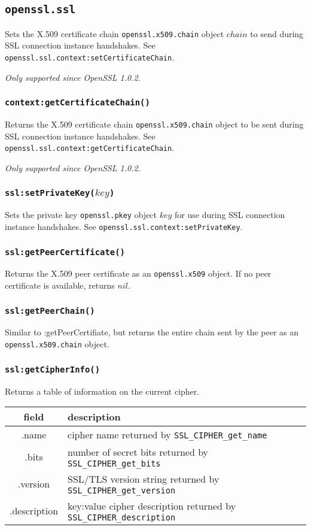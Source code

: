 \documentclass[11pt, oneside]{memoir}
\newcommand*{\fn}[1]{\texttt{#1}\xspace}
\newcommand*{\module}[1]{\texttt{#1}\xspace}
\newcounter{toccols}
\newenvironment{Module}[1]{
	\subsection{\texttt{#1}}
	\addtocontents{toc}{
		\protect\begin{multicols}{\value{toccols}}
	}
}{
	\addtocontents{toc}{\protect\end{multicols}}
}
\begin{document}
\begin{Module}{openssl.ssl}
Sets the X.509 certificate chain \module{openssl.x509.chain} object $chain$ to send during SSL connection instance handshakes.
See \fn{openssl.ssl.context:setCertificateChain}.

\emph{Only supported since OpenSSL 1.0.2.}

\subsubsection[\fn{context:getCertificateChain}]{\fn{context:getCertificateChain()}}

Returns the X.509 certificate chain \module{openssl.x509.chain} object to be sent during SSL connection instance handshakes.
See \fn{openssl.ssl.context:getCertificateChain}.

\emph{Only supported since OpenSSL 1.0.2.}

\subsubsection[\fn{ssl:setPrivateKey}]{\fn{ssl:setPrivateKey($key$)}}

Sets the private key \module{openssl.pkey} object $key$ for use during SSL connection instance handshakes.
See \fn{openssl.ssl.context:setPrivateKey}.

\subsubsection[\fn{ssl:getPeerCertificate}]{\fn{ssl:getPeerCertificate()}}

Returns the X.509 peer certificate as an \module{openssl.x509} object. If no peer certificate is available, returns $nil$.

\subsubsection[\fn{ssl:getPeerChain}]{\fn{ssl:getPeerChain()}}

Similar to :getPeerCertifiate, but returns the entire chain sent by the peer as an \module{openssl.x509.chain} object.

\subsubsection[\fn{ssl:getCipherInfo}]{\fn{ssl:getCipherInfo()}}

Returns a table of information on the current cipher.

\begin{tabular}{ c | l }
field & description\\\hline
.name & cipher name returned by \fn{SSL\_CIPHER\_get\_name}\\
.bits & number of secret bits returned by \fn{SSL\_CIPHER\_get\_bits}\\
.version & SSL/TLS version string returned by \fn{SSL\_CIPHER\_get\_version}\\
.description & key:value cipher description returned by \fn{SSL\_CIPHER\_description}
\end{tabular}


\end{Module}
\end{document}
